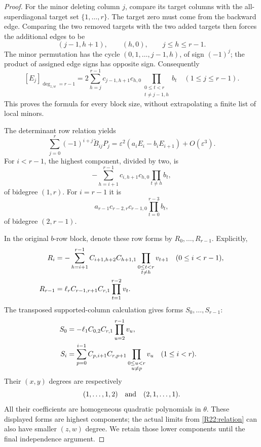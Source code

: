 \begin{proof}
For the minor deleting column $j$, compare its target columns with
the all-superdiagonal target set $\{1,\ldots,r\}$.
The target zero must come from the backward edge. Comparing the
two removed targets with the two added targets then forces the
additional edges to be
\[
 (j-1,h+1),\qquad(h,0),\qquad j\leq h\leq r-1.
\]
The minor permutation has the cycle
$(0,1,\ldots,j-1,h)$, of sign $(-1)^j$; the product of assigned
edge signs has opposite sign. Consequently
\begin{equation}\label{R22:Etop}
 [E_j]_{\deg_{z,w}=r-1}
 =2\sum_{h=j}^{r-1}c_{j-1,h+1}c_{h,0}
           \prod_{\substack{0\leq t<r\\t\ne j-1,h}}b_t
 \quad(1\leq j\leq r-1).
\end{equation}
This proves the formula for every block size, without extrapolating
a finite list of local minors.

The determinant row relation yields
\begin{equation}\label{R22:relation}
 \sum_{j=0}^{r}(-1)^{i+j}\widetilde B_{ij}P_j
 =\varepsilon^2(a_iE_i-b_iE_{i+1})+O(\varepsilon^3).
\end{equation}
For $i<r-1$, the highest component, divided by two, is
\[
 -\sum_{h=i+1}^{r-1}c_{i,h+1}c_{h,0}
                          \prod_{t\ne h}b_t,
\]
of bidegree $(1,r)$. For $i=r-1$ it is
\[
 a_{r-1}c_{r-2,r}c_{r-1,0}\prod_{t=0}^{r-3}b_t,
\]
of bidegree $(2,r-1)$.

In the original $b$-row block, denote these row forms by
$R_0,\ldots,R_{r-1}$. Explicitly,
\begin{align}
 R_i&=-\sum_{h=i+1}^{r-1}C_{i+1,h+2}C_{h+1,1}
                 \prod_{\substack{0\leq t<r\\t\ne h}}v_{t+1}
                     &&(0\leq i<r-1),\label{R22:Rforms}\\
 R_{r-1}&=\ell_r C_{r-1,r+1}C_{r,1}
                                      \prod_{t=1}^{r-2}v_t.\notag
\end{align}
The transposed supported-column calculation gives forms
$S_0,\ldots,S_{r-1}$:
\begin{align}
 S_0&=-\ell_1 C_{0,2}C_{r,1}\prod_{u=2}^{r-1}v_u,
                                                     \label{R22:Sforms}\\
 S_i&=\sum_{p=0}^{i-1}C_{p,i+1}C_{r,p+1}
                    \prod_{\substack{0\leq u<r\\u\ne p}}v_u
                    &&(1\leq i<r).\notag
\end{align}
Their $(x,y)$ degrees are respectively
\begin{equation}\label{R22:grades}
 (1,\ldots,1,2)\quad\hbox{and}\quad(2,1,\ldots,1).
\end{equation}
All their coefficients are homogeneous quadratic polynomials in
$\theta$. These displayed forms are highest components; the actual
limits from \eqref{R22:relation} can also have smaller $(z,w)$ degree.
We retain those lower components until the final independence argument.


\end{proof}
